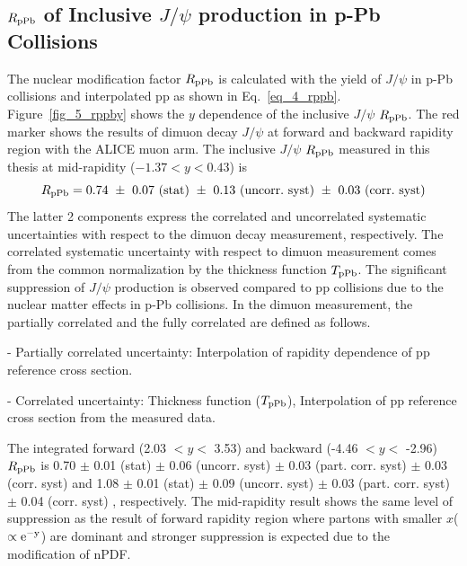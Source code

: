 \subsection{$R_{\rm{pPb}}$ of Inclusive $J/\psi$ production in p-Pb Collisions}
The nuclear modification factor $R_{\rm{pPb}}$ is calculated with the yield of $J/\psi$  in p-Pb collisions and interpolated pp as shown in Eq.~\ref{eq_4_rppb}.
Figure~\ref{fig_5_rppby} shows the $y$ dependence of the inclusive $J/\psi$ $R_{\rm{pPb}}$. 
The red marker shows the results of dimuon decay $J/\psi$ at forward and backward rapidity region with the ALICE muon arm.  
The inclusive $J/\psi$ $R_{\rm{pPb}}$ measured in this thesis at mid-rapidity ($-1.37 < y< 0.43$) is
\begin{equation}
  R_{\rm{pPb}} = \rm{0.74 ~\pm ~0.07 ~(stat) ~\pm ~0.13 ~(uncorr.~syst) ~\pm ~0.03 ~(corr.~syst) }
\end{equation}
The latter 2 components express the correlated and uncorrelated systematic uncertainties with respect to the dimuon decay measurement, respectively. 
The correlated systematic uncertainty with respect to dimuon measurement comes from the common normalization by the thickness function $T_{\rm{pPb}}$.
The significant suppression of $J/\psi$ production is observed compared to pp collisions due to the nuclear matter effects in p-Pb collisions. 
In the dimuon measurement,  the partially correlated and the fully correlated are defined as follows. 
\begin{description}
	\item{- Partially correlated uncertainty:} Interpolation of rapidity dependence of pp reference cross section. 
	\item{- Correlated uncertainty:}  Thickness function ($T_{\rm{pPb}}$), Interpolation of pp reference cross section from the measured data.
\end{description} 
The integrated forward (2.03 $<y<$ 3.53) and backward (-4.46 $<y<$ -2.96) $R_{\rm{pPb}}$ is 
0.70 $\pm$ 0.01 (stat) $\pm$ 0.06 (uncorr. syst) $\pm$ 0.03 (part. corr. syst) $\pm$ 0.03 (corr. syst) and 
1.08 $\pm$ 0.01 (stat) $\pm$ 0.09 (uncorr. syst) $\pm$ 0.03 (part. corr. syst) $\pm$ 0.04 (corr. syst) 
, respectively.
The mid-rapidity result shows the same level of suppression as the result of forward rapidity region where partons with smaller $x$($\propto \rm{e}^{-y}$) are dominant and stronger suppression is expected due to the modification of nPDF. 
